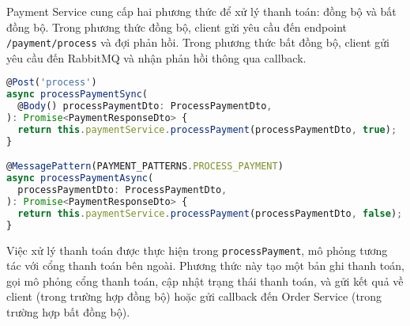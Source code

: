 Payment Service cung cấp hai phương thức để xử lý thanh toán: đồng bộ và bất đồng bộ. Trong phương thức đồng bộ, client gửi yêu cầu đến endpoint \texttt{/payment/process} và đợi phản hồi. Trong phương thức bất đồng bộ, client gửi yêu cầu đến RabbitMQ và nhận phản hồi thông qua callback.

\begin{lstlisting}[language=Typescript]
@Post('process')
async processPaymentSync(
  @Body() processPaymentDto: ProcessPaymentDto,
): Promise<PaymentResponseDto> {
  return this.paymentService.processPayment(processPaymentDto, true);
}

@MessagePattern(PAYMENT_PATTERNS.PROCESS_PAYMENT)
async processPaymentAsync(
  processPaymentDto: ProcessPaymentDto,
): Promise<PaymentResponseDto> {
  return this.paymentService.processPayment(processPaymentDto, false);
}
\end{lstlisting}

Việc xử lý thanh toán được thực hiện trong \texttt{processPayment}, mô phỏng tương tác với cổng thanh toán bên ngoài. Phương thức này tạo một bản ghi thanh toán, gọi mô phỏng cổng thanh toán, cập nhật trạng thái thanh toán, và gửi kết quả về client (trong trường hợp đồng bộ) hoặc gửi callback đến Order Service (trong trường hợp bất đồng bộ).

